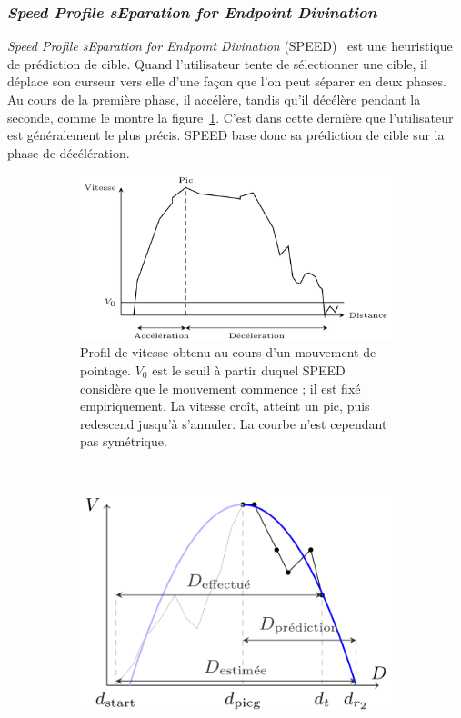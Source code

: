 		
	\subsubsection{\emph{Speed Profile sEparation for Endpoint Divination}}
	\emph{Speed Profile sEparation for Endpoint Divination} (SPEED)~\cite{wonner2011speed} est une heuristique de prédiction de cible. Quand l'utilisateur tente de sélectionner une cible, il déplace son curseur vers elle d'une façon que l'on peut séparer en deux phases. Au cours de la première phase, il accélère, tandis qu'il décélère pendant la seconde, comme le montre la figure~\ref{fig:speedProfile}. C'est dans cette dernière que l'utilisateur est généralement le plus précis. SPEED base donc sa prédiction de cible sur la phase de décélération.
	
	\begin{figure}[!htbp]
		\begin{subfigure}[t]{0.49\textwidth}
			\centering
			\includegraphics[width=\textwidth]{figures/ch2/speedProfile}
			\caption{Profil de vitesse obtenu au cours d'un mouvement de pointage. $V_{0}$ est le seuil à partir duquel SPEED considère que le mouvement commence ; il est fixé empiriquement. La vitesse croît, atteint un pic, puis redescend jusqu'à s'annuler. La courbe n'est cependant pas symétrique.}
			\label{fig:speedProfile}
		\end{subfigure}
		~
		\begin{subfigure}[t]{0.49\textwidth}
			\centering
			\includegraphics[width=\textwidth]{figures/ch2/speedExplained}

\end{subfigure}
\end{figure}
